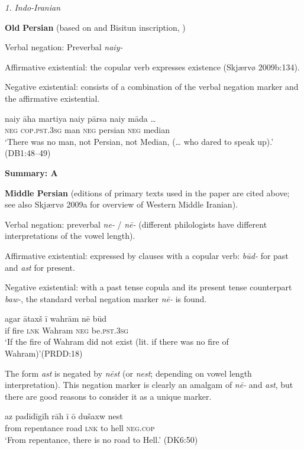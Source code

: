 ﻿\documentclass[output=paper]{langsci/langscibook}
\begin{document}
\begin{unindented}
\textit{1. Indo-Iranian}

\textbf{Old} \textbf{Persian} (based on \citealt{Skjærvø2009b} and Bisitun inscription, \citealt{Schmitt1991})

Verbal negation: Preverbal \textit{naiy-}

Affirmative existential: the copular verb expresses existence (Skjærvø 2009b:134).

Negative existential: consists of a combination of the verbal negation
marker and the affirmative existential.
%
\begin{exe}\ex
    \gll naiy āha martiya   naiy  pārsa   naiy māda … \\
\textsc{neg} \textsc{cop.pst.3sg} man \textsc{neg} persian  \textsc{neg} median \\
    \glt `There was no man, not Persian, not Median, (… who dared to speak up).' (DB1:48--49)
    \end{exe}
%
\textbf{Summary: A}

\textbf{Middle Persian} (editions of primary texts used in the paper are cited above; see also Skjærvø 2009a for overview of Western Middle Iranian). 

Verbal negation: preverbal \textit{ne-} / \textit{nē-} (different philologists have different interpretations of the vowel length). 

Affirmative existential: expressed by clauses with a copular verb: \textit{būd-} for past and \textit{ast} for present.

Negative existential: with a past tense copula and its present tense counterpart \textit{baw-}, the standard verbal negation marker \textit{nē-} is found.
%
\begin{exe}\ex
    \gll agar ātaxš ī        wahrām  nē     būd \\
if      fire    \textsc{lnk}   Wahram \textsc{neg}  be.\textsc{pst.3sg} \\
    \glt `If the fire of Wahram did not exist (lit. if there was no fire of Wahram)'(PRDD:18)
    \end{exe}

The form \textit{ast} is negated by \textit{nēst} (or \textit{nest}; depending on vowel length interpretation). This negation marker is clearly an amalgam of \textit{nē-} and \textit{ast}, but there are good reasons to consider it as a unique marker.
%
\begin{exe}\ex
    \gll az      padīdīgīh   rāh  ī        ō dušaxw nest \\
from repentance road \textsc{lnk}   to hell      \textsc{neg.cop} \\
    \glt `From repentance, there is no road to Hell.' (DK6:50)
    \end{exe}


\end{unindented}
\end{document}
